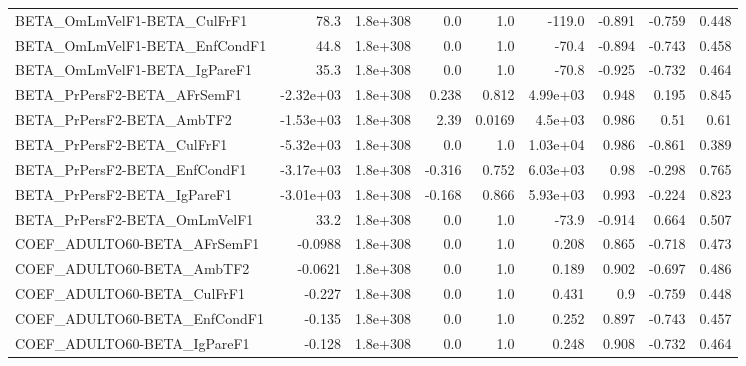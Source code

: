 \begin{tabular}{lrrrrrrrr}
BETA\_OmLmVelF1-BETA\_CulFrF1           &        78.3 &     1.8e+308 &     0.0 &      1.0 &     -119.0 &      -0.891 &       -0.759 &         0.448 \\
BETA\_OmLmVelF1-BETA\_EnfCondF1         &        44.8 &     1.8e+308 &     0.0 &      1.0 &      -70.4 &      -0.894 &       -0.743 &         0.458 \\
BETA\_OmLmVelF1-BETA\_IgPareF1          &        35.3 &     1.8e+308 &     0.0 &      1.0 &      -70.8 &      -0.925 &       -0.732 &         0.464 \\
BETA\_PrPersF2-BETA\_AFrSemF1           &   -2.32e+03 &     1.8e+308 &   0.238 &    0.812 &   4.99e+03 &       0.948 &        0.195 &         0.845 \\
BETA\_PrPersF2-BETA\_AmbTF2             &   -1.53e+03 &     1.8e+308 &    2.39 &   0.0169 &    4.5e+03 &       0.986 &         0.51 &          0.61 \\
BETA\_PrPersF2-BETA\_CulFrF1            &   -5.32e+03 &     1.8e+308 &     0.0 &      1.0 &   1.03e+04 &       0.986 &       -0.861 &         0.389 \\
BETA\_PrPersF2-BETA\_EnfCondF1          &   -3.17e+03 &     1.8e+308 &  -0.316 &    0.752 &   6.03e+03 &        0.98 &       -0.298 &         0.765 \\
BETA\_PrPersF2-BETA\_IgPareF1           &   -3.01e+03 &     1.8e+308 &  -0.168 &    0.866 &   5.93e+03 &       0.993 &       -0.224 &         0.823 \\
BETA\_PrPersF2-BETA\_OmLmVelF1          &        33.2 &     1.8e+308 &     0.0 &      1.0 &      -73.9 &      -0.914 &        0.664 &         0.507 \\
COEF\_ADULTO60-BETA\_AFrSemF1           &     -0.0988 &     1.8e+308 &     0.0 &      1.0 &      0.208 &       0.865 &       -0.718 &         0.473 \\
COEF\_ADULTO60-BETA\_AmbTF2             &     -0.0621 &     1.8e+308 &     0.0 &      1.0 &      0.189 &       0.902 &       -0.697 &         0.486 \\
COEF\_ADULTO60-BETA\_CulFrF1            &      -0.227 &     1.8e+308 &     0.0 &      1.0 &      0.431 &         0.9 &       -0.759 &         0.448 \\
COEF\_ADULTO60-BETA\_EnfCondF1          &      -0.135 &     1.8e+308 &     0.0 &      1.0 &      0.252 &       0.897 &       -0.743 &         0.457 \\
COEF\_ADULTO60-BETA\_IgPareF1           &      -0.128 &     1.8e+308 &     0.0 &      1.0 &      0.248 &       0.908 &       -0.732 &         0.464 \\

\end{tabular}
